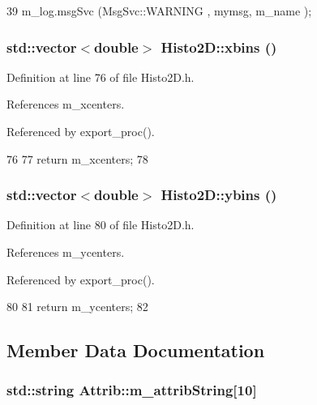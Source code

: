 \begin{DoxyCode}
39 { m_log.msgSvc (MsgSvc::WARNING , mymsg, m_name ); }
\end{DoxyCode}
\hypertarget{classHisto2D_a8f42529a5fba07c339e547bf504dd418}{
\subsubsection[{xbins}]{\setlength{\rightskip}{0pt plus 5cm}std::vector$<$double$>$ Histo2D::xbins ()}}
\label{classHisto2D_a8f42529a5fba07c339e547bf504dd418}


Definition at line 76 of file Histo2D.h.

References m\_\-xcenters.

Referenced by export\_\-proc().


\begin{DoxyCode}
76                            {  
77     return m_xcenters;
78   }
\end{DoxyCode}
\hypertarget{classHisto2D_a0ae225e33eb9837137b10a159ac1d4f2}{
\subsubsection[{ybins}]{\setlength{\rightskip}{0pt plus 5cm}std::vector$<$double$>$ Histo2D::ybins ()}}
\label{classHisto2D_a0ae225e33eb9837137b10a159ac1d4f2}


Definition at line 80 of file Histo2D.h.

References m\_\-ycenters.

Referenced by export\_\-proc().


\begin{DoxyCode}
80                            {  
81     return m_ycenters;
82   }
\end{DoxyCode}


\subsection{Member Data Documentation}
\hypertarget{classAttrib_a3414521d7a82476e874b25a5407b5e63}{
\subsubsection[{m\_\-attribString}]{\setlength{\rightskip}{0pt plus 5cm}std::string {\bf Attrib::m\_\-attribString}\mbox{[}10\mbox{]}}}
\label{classAttrib_a3414521d7a82476e874b25a5407b5e63}


